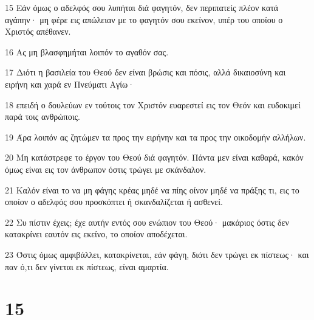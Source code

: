 \par 15 Εάν όμως ο αδελφός σου λυπήται διά φαγητόν, δεν περιπατείς πλέον κατά αγάπην· μη φέρε εις απώλειαν με το φαγητόν σου εκείνον, υπέρ του οποίου ο Χριστός απέθανεν.
\par 16 Ας μη βλασφημήται λοιπόν το αγαθόν σας.
\par 17 Διότι η βασιλεία του Θεού δεν είναι βρώσις και πόσις, αλλά δικαιοσύνη και ειρήνη και χαρά εν Πνεύματι Αγίω·
\par 18 επειδή ο δουλεύων εν τούτοις τον Χριστόν ευαρεστεί εις τον Θεόν και ευδοκιμεί παρά τοις ανθρώποις.
\par 19 Άρα λοιπόν ας ζητώμεν τα προς την ειρήνην και τα προς την οικοδομήν αλλήλων.
\par 20 Μη κατάστρεφε το έργον του Θεού διά φαγητόν. Πάντα μεν είναι καθαρά, κακόν όμως είναι εις τον άνθρωπον όστις τρώγει με σκάνδαλον.
\par 21 Καλόν είναι το να μη φάγης κρέας μηδέ να πίης οίνον μηδέ να πράξης τι, εις το οποίον ο αδελφός σου προσκόπτει ή σκανδαλίζεται ή ασθενεί.
\par 22 Συ πίστιν έχεις; έχε αυτήν εντός σου ενώπιον του Θεού· μακάριος όστις δεν κατακρίνει εαυτόν εις εκείνο, το οποίον αποδέχεται.
\par 23 Όστις όμως αμφιβάλλει, κατακρίνεται, εάν φάγη, διότι δεν τρώγει εκ πίστεως· και παν ό,τι δεν γίνεται εκ πίστεως, είναι αμαρτία.

\chapter{15}

